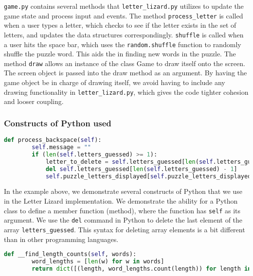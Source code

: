 	\texttt{game.py} contains several methods that \texttt{letter\_lizard.py} utilizes to update the game state and process input and events. The method \texttt{process\_letter} is called when a user types a letter, which checks to see if the letter exists in the set of letters, and updates the data structures correspondingly. \texttt{shuffle} is called when a user hits the space bar, which uses the \texttt{random.shuffle} function to randomly shuffle the puzzle word. This aids the in finding new words in the puzzle. The method \texttt{draw} allows an instance of the class Game to draw itself onto the screen. The screen object is passed into the draw method as an argument. By having the game object be in charge of drawing itself, we avoid having to include any drawing functionality in \texttt{letter\_lizard.py}, which gives the code tighter cohesion and looser coupling.
	
\subsubsection{Constructs of Python used}

\begin{lstlisting}[language=Python, %
  caption=Basic constructs of Python used]
    def process_backspace(self):
        self.message = ""
        if (len(self.letters_guessed) >= 1):
            letter_to_delete = self.letters_guessed[len(self.letters_guessed) - 1]
            del self.letters_guessed[len(self.letters_guessed) - 1]
            self.puzzle_letters_displayed[self.puzzle_letters_displayed.index('')] = letter_to_delete
\end{lstlisting}
In the example above, we demonstrate several constructs of Python that we use in the Letter Lizard implementation. We demonstrate the ability for a Python class to define a member function (method), where the function has \texttt{self} as its argument. We use the \texttt{del} command in Python to delete the last element of the array \texttt{letters\_guessed}. This syntax for deleting array elements is a bit different than in other programming languages.

\begin{lstlisting}[language=Python, %
  caption=Demonstration of functional programming constructs in Python]
    def __find_length_counts(self, words):
        word_lengths = [len(w) for w in words]
        return dict([(length, word_lengths.count(length)) for length in set(word_lengths)])
\end{lstlisting}

